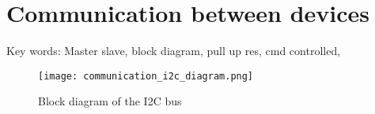 \chapter{Communication between devices}
Key words: Master slave, block diagram, pull up res, cmd controlled,  


\begin{figure}[!ht]
	\centering
	\texttt{[image: communication\_i2c\_diagram.png]}
	\caption{Block diagram of the I2C bus}
	\label{fig:communication_I2C_diagram}
\end{figure}